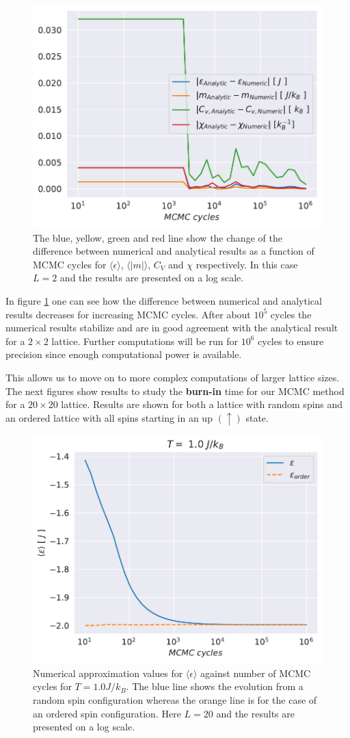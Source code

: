 \documentclass[english,notitlepage,reprint,nofootinbib]{revtex4-1}  %
\begin{document}
\begin{figure}[H]
    \centering
    \includegraphics[width=.5\textwidth]{../figures/numeric_analytic.pdf}
    \caption{The blue, yellow, green and red line show the change of the difference between numerical and analytical results as a function of MCMC cycles for $\langle \epsilon \rangle$, $\langle |m| \rangle$, $C_V$ and $\chi$ respectively. In this case $L=2$ and the results are presented on a log scale.}
    \label{fig:numeric_analytic}
\end{figure}
In figure \ref{fig:numeric_analytic} one can see how the difference between numerical and analytical results decreases for increasing MCMC cycles. After about $10^{5}$ cycles the numerical results stabilize and are in good agreement with the analytical result for a $2 \times 2$ lattice. Further computations will be run for $10^6$ cycles to ensure precision since enough computational power is available.

This allows us to move on to more complex computations of larger lattice sizes. The next figures show results to study the \textbf{burn-in} time for our MCMC method for a $20 \times 20$ lattice. Results are shown for both a lattice with random spins and an ordered lattice with all spins starting in an up $(\uparrow)$ state. 

\begin{figure}[H]
    \centering
    \includegraphics[width=.5\textwidth]{../figures/numeric_L_20_T_1_e.pdf}
    \caption{Numerical approximation values for $\langle \epsilon \rangle$ against number of MCMC cycles for $T=1.0 J/k_B$. The blue line shows the evolution from a random spin configuration whereas the orange line is for the case of an ordered spin configuration. Here $L=20$ and the results are presented on a log scale.}
    \label{fig:numeric_L_20_T_1_e}
\end{figure}
\end{document}
